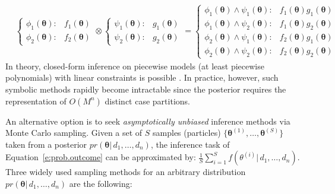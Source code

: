 {\footnotesize
\begin{align}
&\begin{cases}
\phi_1(\boldsymbol{\theta}) : &\!\!\!\!\! f_1(\boldsymbol{\theta})\\
\phi_2(\boldsymbol{\theta}) : &\!\!\!\!\! f_2(\boldsymbol{\theta})
\end{cases}
\otimes
\begin{cases}
\psi_1(\boldsymbol{\theta}) : &\!\!\!\!\! g_1(\boldsymbol{\theta})\\
\psi_2(\boldsymbol{\theta}) : &\!\!\!\!\! g_2(\boldsymbol{\theta})
\end{cases}
\!\!\!=\!\!
\begin{cases}
\phi_1(\boldsymbol{\theta}) \wedge \psi_1(\boldsymbol{\theta}) :\!\!\!\!\! & f_1(\boldsymbol{\theta}) g_1(\boldsymbol{\theta})\\
\phi_1(\boldsymbol{\theta}) \wedge \psi_2(\boldsymbol{\theta}) :\!\!\!\!\! & f_1(\boldsymbol{\theta}) g_2(\boldsymbol{\theta})\\
\phi_2(\boldsymbol{\theta}) \wedge \psi_1(\boldsymbol{\theta}) :\!\!\!\!\! & f_2(\boldsymbol{\theta}) g_1(\boldsymbol{\theta})\\
\phi_2(\boldsymbol{\theta}) \wedge \psi_2(\boldsymbol{\theta}) :\!\!\!\!\! & f_2(\boldsymbol{\theta}) g_2(\boldsymbol{\theta})
\end{cases}
\end{align}
}%
In theory, closed-form inference on piecewise models (at least piecewise polynomials) with linear constraints is possible \cite{Sanner:12}.
In practice, however, such symbolic methods rapidly become intractable since the posterior requires
the representation of $O(M^n)$ distinct case partitions.
   
An alternative option is to seek \emph{asymptotically unbiased} inference methods
via Monte Carlo sampling.
Given a set of $S$ samples (particles) $\{\boldsymbol\theta^{(1)}, \ldots, \boldsymbol\theta^{(S)}\}$ taken from a posterior $pr(\boldsymbol\theta | \, d_1, \ldots, d_n)$, 
the inference task of Equation~\ref{e:prob.outcome} can be approximated by: 
$\frac{1}{S} \sum_{i=1}^S f(\theta^{(i)} | \, d_1, \ldots, d_n)$.
Three widely used sampling methods for an arbitrary distribution $pr(\boldsymbol\theta | \, d_1, \ldots, d_n)$ are the following:

